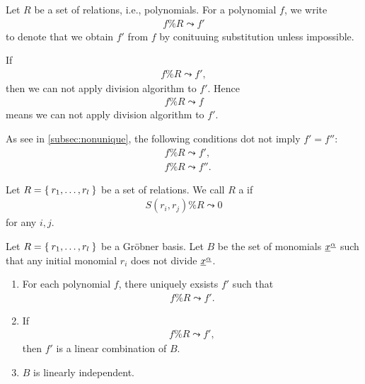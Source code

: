 Let $R$ be a set of relations, i.e., polynomials.
For a polynomial $f$,
we write
\begin{align*}
  f\% R \leadsto f'
\end{align*}
to denote that
we obtain $f'$ from $f$
by conituuing substitution unless impossible.
\begin{remark}
If 
  \begin{align*}
  f\% R \leadsto f',
  \end{align*}
  then we can not apply division algorithm to $f'$.
  Hence
  \begin{align*}
    f\% R \leadsto f
  \end{align*}
  means we can not apply division algorithm to $f'$.
\end{remark}

\begin{remark}
  As see in \cref{subsec:nonunique},
  the following conditions
  dot not imply $f'=f''$:
  \begin{align*}
  &f\% R \leadsto f',\\
  &f\% R \leadsto f''.
  \end{align*}
\end{remark}

\begin{definition}
  Let $R=\Set{r_1,\ldots,r_l}$ be a set of relations.
  We call $R$ a 
  if
  \begin{align*}
    S(r_i,r_j) \% R \leadsto 0
  \end{align*}
  for any $i,j$.
\end{definition}
\begin{theorem}
  Let $R=\Set{r_1,\ldots,r_l}$ be a Gr\"obner basis.
  Let $B$ be the set of monomials ${\underline{x}}^{\underline{\alpha}}$
  such that any initial monomial $r_i$ does not divide ${\underline{x}}^{\underline{\alpha}}$.
  \begin{enumerate}
  \item For each polynomial $f$,
    there uniquely exsists $f'$ such that
    \begin{align*}
      f\% R \leadsto f'.
    \end{align*}
  \item If   
    \begin{align*}
      f\% R \leadsto f',
    \end{align*}
    then $f'$ is a linear combination of $B$.
  \item $B$ is linearly independent.
 \end{enumerate}
\end{theorem}

